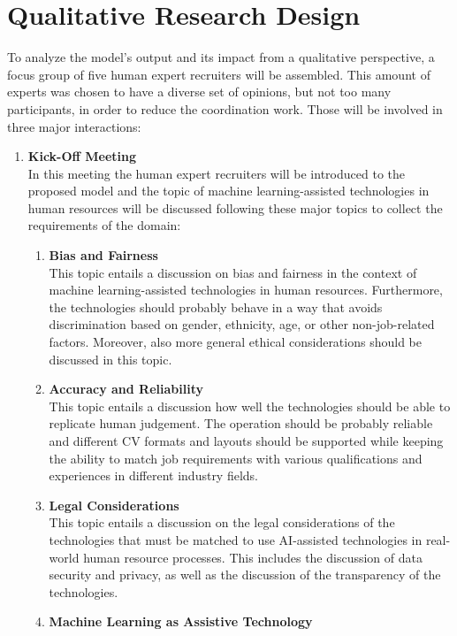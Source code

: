 \documentclass[draft,final]{thesisclass} %
\begin{document}
\section{Qualitative Research Design} \label{qualitative_research_design}
To analyze the model's output and its impact from a qualitative perspective, a focus group of five human expert recruiters will be assembled.
This amount of experts was chosen to have a diverse set of opinions, but not too many participants, in order to reduce the coordination work.
Those will be involved in three major interactions:
\begin{enumerate}
    \item \textbf{Kick-Off Meeting} \label{kick_off_meeting}\\ 
    In this meeting the human expert recruiters will be introduced to the proposed model and the topic of machine learning-assisted technologies in human resources will be discussed following these major topics to collect the requirements of the domain:
    \begin{enumerate}
        \item \textbf{Bias and Fairness}\\
        This topic entails a discussion on bias and fairness in the context of machine learning-assisted technologies in human resources.
        Furthermore, the technologies should probably behave in a way that avoids discrimination based on gender, ethnicity, age, or other non-job-related factors.
        Moreover, also more general ethical considerations should be discussed in this topic.
        \item \textbf{Accuracy and Reliability}\\
        This topic entails a discussion how well the technologies should be able to replicate human judgement.
        The operation should be probably reliable and different \acs{CV} formats and layouts should be supported while keeping the ability to match job requirements with various qualifications and experiences in different industry fields.
        \item \textbf{Legal Considerations}\\
        This topic entails a discussion on the legal considerations of the technologies that must be matched to use \acs{AI}-assisted technologies in real-world human resource processes.
        This includes the discussion of data security and privacy, as well as the discussion of the transparency of the technologies.
        \item \textbf{Machine Learning as Assistive Technology}\\

\end{enumerate}
\end{enumerate}
\end{document}

